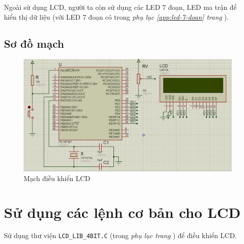 Ngoài sử dụng LCD, người ta còn sử dụng các LED 7 đoạn, LED ma trận để hiển thị dữ liệu (với LED 7 đoạn có trong \textit{phụ lục \ref{app:led-7-doan} trang \pageref{app:led-7-doan}}).
\subsection{Sơ đồ mạch}
\begin{figure}[!h]
\begin{center}
\includegraphics[scale=0.5]{bai-2/image/BAI-2}
\end{center}
\caption{Mạch điều khiển LCD}
\end{figure}
\section{Sử dụng các lệnh cơ bản cho LCD}
Sử dụng thư viện \verb|LCD_LIB_4BIT.C| (trong \emph{phụ lục trang \pageref{def:lcd}}) để điều khiển LCD.

